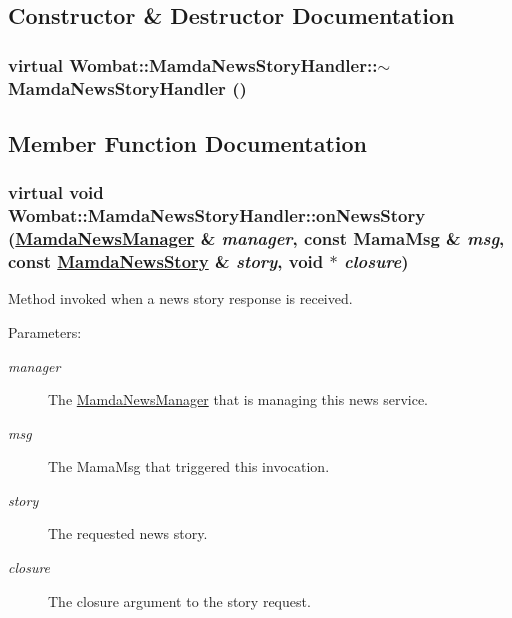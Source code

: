 \subsection{Constructor \& Destructor Documentation}
\hypertarget{classWombat_1_1MamdaNewsStoryHandler_8073b40cb9d0d6ae6b881ba3c83d5a1e}{
\subsubsection[$\sim$MamdaNewsStoryHandler]{\setlength{\rightskip}{0pt plus 5cm}virtual Wombat::Mamda\-News\-Story\-Handler::$\sim$Mamda\-News\-Story\-Handler ()}}
\label{classWombat_1_1MamdaNewsStoryHandler_8073b40cb9d0d6ae6b881ba3c83d5a1e}




\subsection{Member Function Documentation}
\hypertarget{classWombat_1_1MamdaNewsStoryHandler_e519358a9619a104431605d9313cee58}{
\subsubsection[onNewsStory]{\setlength{\rightskip}{0pt plus 5cm}virtual void Wombat::Mamda\-News\-Story\-Handler::on\-News\-Story (\hyperlink{classWombat_1_1MamdaNewsManager}{Mamda\-News\-Manager} \& {\em manager}, const Mama\-Msg \& {\em msg}, const \hyperlink{classWombat_1_1MamdaNewsStory}{Mamda\-News\-Story} \& {\em story}, void $\ast$ {\em closure})}}
\label{classWombat_1_1MamdaNewsStoryHandler_e519358a9619a104431605d9313cee58}


Method invoked when a news story response is received. 

\begin{Desc}
\item[Parameters:]
\begin{description}
\item[{\em manager}]The \hyperlink{classWombat_1_1MamdaNewsManager}{Mamda\-News\-Manager} that is managing this news service. \item[{\em msg}]The Mama\-Msg that triggered this invocation. \item[{\em story}]The requested news story. \item[{\em closure}]The closure argument to the story request. \end{description}
\end{Desc}
